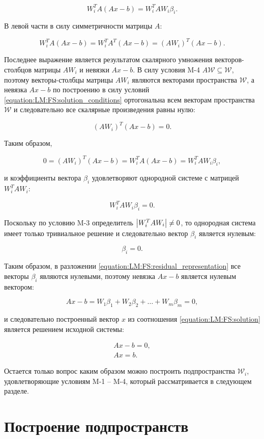 $$
	W_i^T A ( Ax - b ) = W_i^T A W_i \beta_i.
$$

В левой части в силу симметричности матрицы $A$:

$$
	W_i^T A ( Ax - b ) = W_i^T A^T ( Ax - b ) = ( A W_i )^T ( Ax - b ).
$$

Последнее выражение является результатом скалярного умножения векторов-столбцов матрицы $A W_i$ и невязки $Ax - b$. В силу условия
M-4 $A \mathcal W \subseteq \mathcal W$, поэтому векторы-столбцы матрицы $A W_i$ являются векторами пространства $\mathcal W$,
а невязка $Ax - b$ по построению в силу условий \ref{equation:LM:FS:solution_conditions} ортогональна всем векторам пространства
$\mathcal W$ и следовательно все скалярные произведения равны нулю:

$$
	( A W_i )^T ( Ax - b ) = 0.
$$

Таким образом,

$$
	0 = ( A W_i )^T ( Ax - b ) = W_i^T A ( Ax - b ) = W_i^T A W_i \beta_i,
$$

и коэффициенты вектора $\beta_i$ удовлетворяют однородной системе с матрицей $W_i^T A W_i$:

$$
	W_i^T A W_i \beta_i = 0.
$$

Поскольку по условию M-3 определитель $\left | W_i^T A W_i \right | \ne 0$, то однородная система имеет только тривиальное решение и
следовательно вектор $\beta_i$ является нулевым:

$$
	\beta_i = 0.
$$

Таким образом, в разложении \ref{equation:LM:FS:residual_representation} все векторы $\beta_i$ являются нулевыми, поэтому невязка
$Ax - b$ является нулевым вектором:

$$
	Ax - b = W_1 \beta_1 + W_2 \beta_2 + \dots + W_m \beta_m = 0,
$$

и следовательно построенный вектор $x$ из соотношения \ref{equation:LM:FS:solution} является решением исходной системы:

$$
	\begin{array}{c}
		Ax - b = 0, \\
		Ax = b.
	\end{array}
$$

Остается только вопрос каким образом можно построить подпространства $\mathcal W_i$, удовлетворяющие условиям M-1 -- M-4, который 
рассматривается в следующем разделе.

\section{Построение подпространств} \label{section:LM:finding_subspaces}

